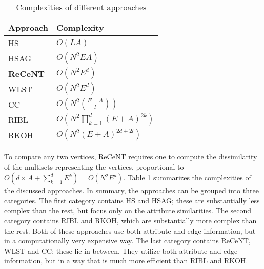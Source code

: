 \begin{table}
    \centering
    \caption{Complexities of different approaches}
    \label{tab:complexities}
    \begin{tabular}{@{}ll@{}}
        \toprule
        \textbf{Approach} & \textbf{Complexity} \\
        \midrule        
        HS    & $O\left (  LA \right )$       \\
        
         HSAG  & $O \left ( N^2EA \right)$     \\
        
        \textbf{ReCeNT}  & $O \left ( N^2  E^d  \right )$ \\       
        
         WLST  & $O \left( N^2 E^d \right ) $  \\
        
        CC    & $O \left( N^2   {{E + A}\choose{l}} \right)$  \\
        
        RIBL  & $O \left(  N^2 \prod_{k=1}^{d}(E + A)^{2k} \right) $  \\
        
         RKOH  & $O \left(  N^2 \left( E + A \right)^{2d + 2l} \right)$ \\
        \bottomrule
    \end{tabular}
    
\end{table}



To compare any two vertices, ReCeNT requires one to compute the dissimilarity of the multisets representing the vertices, proportional to $O(d\times A + \sum_{k=1}^d E^k) = O\left (N^2 E^d \right )$.
Table \ref{tab:complexities} summarizes the complexities of the discussed approaches.
In summary, the approaches can be grouped into three categories.
The first category contains HS and HSAG; these are substantially less complex than the rest, but focus only on the attribute similarities.
The second category contains RIBL and RKOH, which are substantially more complex than the rest.
Both of these approaches use both attribute and edge information, but in a computationally very expensive way.
The last category contains ReCeNT, WLST and CC; these lie in between. They utilize both attribute and edge information, but in a way that is much more efficient than RIBL and RKOH.
\vspace{2pt}



